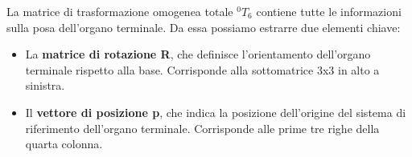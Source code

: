 \documentclass[11pt, a4paper]{article}
\begin{document}
\newpage
\begin{par}
\begin{flushleft}
La matrice di trasformazione omogenea totale $^0 T_6$ contiene tutte le informazioni sulla posa dell'organo terminale. Da essa possiamo estrarre due elementi chiave:
\end{flushleft}
\end{par}

\begin{itemize}
\setlength{\itemsep}{-1ex}
   \item{\begin{flushleft} La \textbf{matrice di rotazione R}, che definisce l'orientamento dell'organo terminale rispetto alla base. Corrisponde alla sottomatrice 3x3 in alto a sinistra. \end{flushleft}}
   \item{\begin{flushleft} Il \textbf{vettore di posizione p}, che indica la posizione dell'origine del sistema di riferimento dell'organo terminale. Corrisponde alle prime tre righe della quarta colonna. \end{flushleft}}
\end{itemize}
\end{document}
